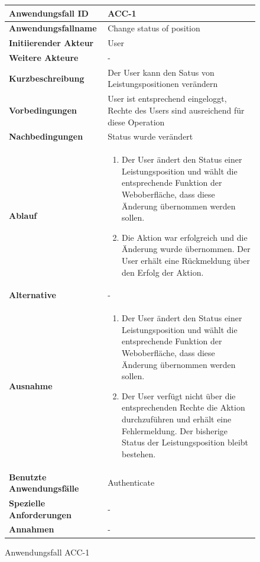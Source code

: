 \begin{figure}[h]
	\centering
	\begin{tabularx}{\textwidth}{ X | X }
		\textbf{Anwendungsfall ID} & ACC-1 \\ \hline
		\textbf{Anwendungsfallname} & Change status of position\\ \hline
		\textbf{Initiierender Akteur} & User \\ \hline
		\textbf{Weitere Akteure} & -  \\ \hline
		\textbf{Kurzbeschreibung} & Der User kann den Satus von Leistungspositionen ver\"andern \\ \hline
		\textbf{Vorbedingungen} & User ist entsprechend eingeloggt, Rechte des Users sind ausreichend f\"ur diese Operation \\ \hline
		\textbf{Nachbedingungen} & Status wurde ver\"andert \\ \hline
		\textbf{Ablauf} &
		\begin{enumerate}
			\item Der User \"andert den Status einer Leistungsposition und w\"ahlt die entsprechende Funktion der Weboberfl\"ache, dass diese \"Anderung \"ubernommen werden sollen.
			\item Die Aktion war erfolgreich und die \"Anderung wurde \"ubernommen.  Der User erh\"alt eine R\"uckmeldung \"uber den Erfolg der Aktion.
		\end{enumerate} \\ \hline
		\textbf{Alternative} & -
		\\ \hline
		\textbf{Ausnahme} &
		\begin{enumerate}
			\item Der User \"andert den Status einer Leistungsposition und w\"ahlt die entsprechende Funktion der Weboberfl\"ache,  dass diese \"Anderung \"ubernommen werden sollen.
			\item Der User verf\"ugt nicht \"uber die entsprechenden Rechte die Aktion durchzuf\"uhren und erh\"alt eine Fehlermeldung. Der bisherige Status der Leistungsposition bleibt bestehen.
		\end{enumerate}  \\ \hline
		\textbf{Benutzte Anwendungsfälle} & Authenticate \\ \hline
		\textbf{Spezielle Anforderungen} & - \\ \hline
		\textbf{Annahmen} & -
	\end{tabularx}
	\caption{Anwendungsfall ACC-1}
	\label{fig:anwendungsfall-server-tabelle-ACC-1}
\end{figure}

